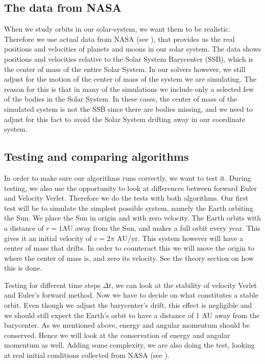 \documentclass[reprint, english,notitlepage,nofootinbib]{revtex4-1}  %
\begin{document}
\subsection{The data from NASA}

When we study orbits in our solar-system, we want them to be realistic. Therefore we use actual data from NASA (see \citep{NASA}), that provides us the real positions and velocities of planets and moons in our solar system. The data shows positions and velocities relative to the Solar System Barycenter (SSB), which is the center of mass of the entire Solar System. In our solvers however, we still adjust for the motion of the center of mass of the system we are simulating. The reason for this is that in many of the simulations we include only a selected few of the bodies in the Solar System. In these cases, the center of mass of the simulated system is not the SSB since there are bodies missing, and we need to adjust for this fact to avoid the Solar System drifting away in our coordinate system.


\subsection{Testing and comparing algorithms}

In order to make sure our algorithms runs correctly, we want to test it. During testing, we also use the opportunity to look at differences between forward Euler and Velocity Verlet. Therefore we do the tests with both algorithms. Our first test will be to simulate the simplest possible system, namely the Earth orbiting the Sun. We place the Sun in origin and with zero velocity. The Earth orbits with a distance of $r=1$AU away from the Sun, and makes a full orbit every year. This gives it an initial velocity of $v = 2\pi \text{ AU}/\text{yr}.$ This system however will have a center of mass that drifts. In order to counteract this we will move the origin to where the center of mass is, and zero its velocity. See the theory section on how this is done.

Testing for different time steps $\Delta t$, we can look at the stability of velocity Verlet and Euler's forward method. Now we have to decide on what constitutes a stable orbit. Even though we adjust the barycenter's drift, this effect is negligible and we should still expect the Earth's orbit to have a distance of 1 AU away from the barycenter. As we mentioned above, energy and angular momentum should be conserved. Hence we will look at the conservation of energy and angular momentum as well. Adding some complexity, we are also doing the test, looking at real initial conditions collected from NASA (see \citep{NASA}).
\end{document}
